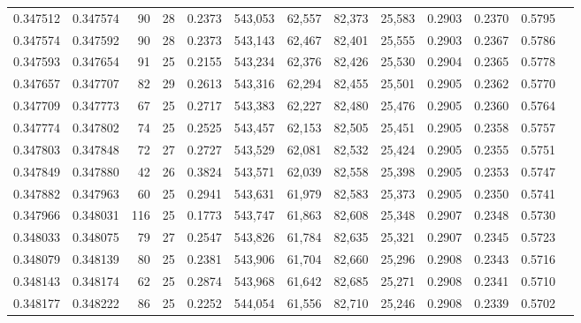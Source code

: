 \begin{tabular}{rrrrrrrrrrrrr}
0.347512 & 0.347574 &    90 &  28 &                                     0.2373 & 543,053 &  62,557 &  82,373 &  25,583 & 0.2903 & 0.2370 & 0.5795 \\
0.347574 & 0.347592 &    90 &  28 &                                     0.2373 & 543,143 &  62,467 &  82,401 &  25,555 & 0.2903 & 0.2367 & 0.5786 \\
0.347593 & 0.347654 &    91 &  25 &                                     0.2155 & 543,234 &  62,376 &  82,426 &  25,530 & 0.2904 & 0.2365 & 0.5778 \\
0.347657 & 0.347707 &    82 &  29 &                                     0.2613 & 543,316 &  62,294 &  82,455 &  25,501 & 0.2905 & 0.2362 & 0.5770 \\
0.347709 & 0.347773 &    67 &  25 &                                     0.2717 & 543,383 &  62,227 &  82,480 &  25,476 & 0.2905 & 0.2360 & 0.5764 \\
0.347774 & 0.347802 &    74 &  25 &                                     0.2525 & 543,457 &  62,153 &  82,505 &  25,451 & 0.2905 & 0.2358 & 0.5757 \\
0.347803 & 0.347848 &    72 &  27 &                                     0.2727 & 543,529 &  62,081 &  82,532 &  25,424 & 0.2905 & 0.2355 & 0.5751 \\
0.347849 & 0.347880 &    42 &  26 &                                     0.3824 & 543,571 &  62,039 &  82,558 &  25,398 & 0.2905 & 0.2353 & 0.5747 \\
0.347882 & 0.347963 &    60 &  25 &                                     0.2941 & 543,631 &  61,979 &  82,583 &  25,373 & 0.2905 & 0.2350 & 0.5741 \\
0.347966 & 0.348031 &   116 &  25 &                                     0.1773 & 543,747 &  61,863 &  82,608 &  25,348 & 0.2907 & 0.2348 & 0.5730 \\
0.348033 & 0.348075 &    79 &  27 &                                     0.2547 & 543,826 &  61,784 &  82,635 &  25,321 & 0.2907 & 0.2345 & 0.5723 \\
0.348079 & 0.348139 &    80 &  25 &                                     0.2381 & 543,906 &  61,704 &  82,660 &  25,296 & 0.2908 & 0.2343 & 0.5716 \\
0.348143 & 0.348174 &    62 &  25 &                                     0.2874 & 543,968 &  61,642 &  82,685 &  25,271 & 0.2908 & 0.2341 & 0.5710 \\
0.348177 & 0.348222 &    86 &  25 &                                     0.2252 & 544,054 &  61,556 &  82,710 &  25,246 & 0.2908 & 0.2339 & 0.5702 \\

\end{tabular}
